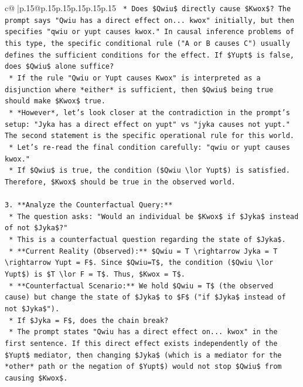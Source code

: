 \documentclass{article}
\begin{document}
{\begin{supertabular}{c@{$\;$}|p{.15\linewidth}@{}p{.15\linewidth}p{.15\linewidth}p{.15\linewidth}p{.15\linewidth}p{.15\linewidth}}
{{{\texttt{    *   Does \$Qwiu\$ directly cause \$Kwox\$? The prompt says "Qwiu has a direct effect on... kwox" initially, but then specifies "qwiu or yupt causes kwox." In causal inference problems of this type, the specific conditional rule ("A or B causes C") usually defines the sufficient conditions for the effect. If \$Yupt\$ is false, does \$Qwiu\$ alone suffice?} \\
\texttt{        *   If the rule "Qwiu or Yupt causes Kwox" is interpreted as a disjunction where *either* is sufficient, then \$Qwiu\$ being true should make \$Kwox\$ true.} \\
\texttt{        *   *However*, let's look closer at the contradiction in the prompt's setup: "Jyka has a direct effect on yupt" vs "jyka causes not yupt." The second statement is the specific operational rule for this world.} \\
\texttt{        *   Let's re{-}read the final condition carefully: "qwiu or yupt causes kwox."} \\
\texttt{        *   If \$Qwiu\$ is true, the condition (\$Qwiu \textbackslash{}lor Yupt\$) is satisfied. Therefore, \$Kwox\$ should be true in the observed world.} \\
\\ 
\texttt{3.  **Analyze the Counterfactual Query:**} \\
\texttt{    *   The question asks: "Would an individual be \$Kwox\$ if \$Jyka\$ instead of not \$Jyka\$?"} \\
\texttt{    *   This is a counterfactual question regarding the state of \$Jyka\$.} \\
\texttt{    *   **Current Reality (Observed):** \$Qwiu = T \textbackslash{}rightarrow Jyka = T \textbackslash{}rightarrow Yupt = F\$. Since \$Qwiu=T\$, the condition (\$Qwiu \textbackslash{}lor Yupt\$) is \$T \textbackslash{}lor F = T\$. Thus, \$Kwox = T\$.} \\
\texttt{    *   **Counterfactual Scenario:** We hold \$Qwiu = T\$ (the observed cause) but change the state of \$Jyka\$ to \$F\$ ("if \$Jyka\$ instead of not \$Jyka\$").} \\
\texttt{    *   If \$Jyka = F\$, does the chain break?} \\
\texttt{        *   The prompt states "Qwiu has a direct effect on... kwox" in the first sentence. If this direct effect exists independently of the \$Yupt\$ mediator, then changing \$Jyka\$ (which is a mediator for the *other* path or the negation of \$Yupt\$) would not stop \$Qwiu\$ from causing \$Kwox\$.} \\
}}}
\end{supertabular}}
\end{document}
